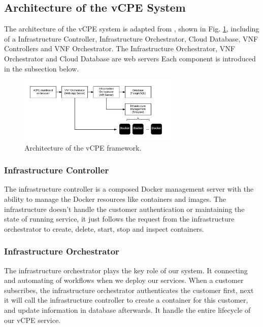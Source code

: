 \documentclass[journal]{IEEEtran}
\begin{document}
\subsection{Architecture of the vCPE System}
The architecture of the vCPE system is adapted from \cite{nfv2014-v111}, shown in Fig. \ref{fig:desc_vcpe_framework}, including of a Infrastructure Controller, Infrastructure Orchestrator, Cloud Database, VNF Controllers and VNF Orchestrator.
The Infrastructure Orchestrator, VNF Orchestrator and Cloud Database are web servers
Each component is introduced in the subsection below.

\begin{figure}[!t]
\centering
\includegraphics[width=3in]{./figures/desc_vcpe_framework}
\caption{Architecture of the vCPE framework.}
\label{fig:desc_vcpe_framework}
\end{figure}

\subsubsection{Infrastructure Controller}

The infrastructure controller is a composed Docker management server with the ability to manage the Docker resources like containers and images. The infrastructure doesn't handle the customer authentication or maintaining the state of running service, it just follows the request from the infrastructure orchestrator to create, delete, start, stop and inspect containers.

\subsubsection{Infrastructure Orchestrator}

The infrastructure orchestrator plays the key role of our system. It connecting and automating of workflows when we deploy our services. When a customer subscribes, the infrastructure orchestrator authenticates the customer first, next it will call the infrastructure controller to create a container for this customer, and update information in database afterwards. It handle the entire lifecycle of our vCPE service.
\end{document}
